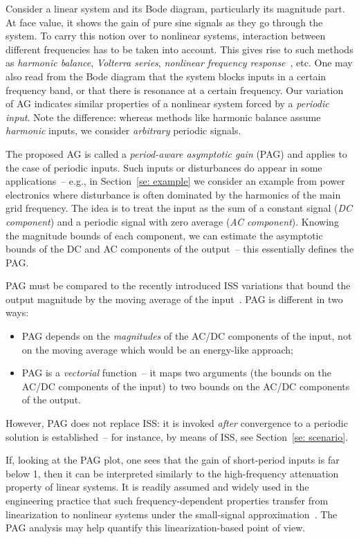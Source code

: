 \documentclass[letterpaper, 10 pt, conference]{ieeeconf}
\begin{document}
Consider a linear system and its Bode diagram, particularly its magnitude part. At face value, it shows the gain of pure sine signals as they go through the system. To carry this notion over to nonlinear systems, interaction between different frequencies has to be taken into account. This gives rise to such methods as \emph{harmonic balance}, \emph{Volterra series}, \emph{nonlinear frequency response}~\cite{pavlovFrequencyResponseFunctions2007}, etc. One may also read from the Bode diagram that the system blocks inputs in a certain frequency band, or that there is resonance at a certain frequency. Our variation of AG indicates similar properties of a nonlinear system forced by a \emph{periodic input}. Note the difference: whereas methods like harmonic balance assume \emph{harmonic} inputs, we consider \emph{arbitrary} periodic signals.

The proposed AG is called a \emph{period-aware asymptotic gain} (PAG) and applies to the case of periodic inputs. Such inputs or disturbances do appear in some applications~-- e.g., in Section~\ref{se: example} we consider an example from power electronics where disturbance is often dominated by the harmonics of the main grid frequency. The idea is to treat the input as the sum of a constant signal (\emph{DC component}) and a periodic signal with zero average (\emph{AC component}). Knowing the magnitude bounds of each component, we can estimate the asymptotic bounds of the DC and AC components of the output~-- this essentially defines the PAG.

PAG must be compared to the recently introduced ISS variations that bound the output magnitude by the moving average of the input~\cite{efimovISSRespectAverage2024,haimovichInputpowertostateStabilityTimevarying2025a}. PAG is different in two ways:
\begin{itemize}
    \item PAG depends on the \emph{magnitudes} of the AC/DC components of the input, not on the moving average which would be an energy-like approach;
    \item PAG is a \emph{vectorial} function~-- it maps two arguments (the bounds on the AC/DC components of the input) to two bounds on the AC/DC components of the output.
\end{itemize}
However, PAG does not replace ISS: it is invoked \emph{after} convergence to a periodic solution is established~-- for instance, by means of ISS, see Section~\ref{se: scenario}.

If, looking at the PAG plot, one sees that the gain of short-period inputs is far below 1, then it can be interpreted similarly to the high-frequency attenuation property of linear systems. It is readily assumed and widely used in the engineering practice that such frequency-dependent properties transfer from linearization to nonlinear systems under the small-signal approximation~\cite{wangHarmonicStabilityPower2019}. The PAG analysis may help quantify this linearization-based point of view.
\end{document}
